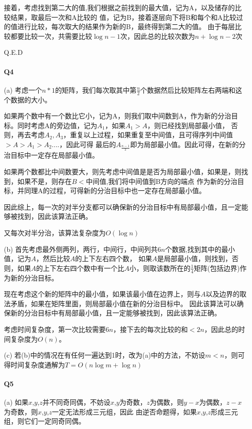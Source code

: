 \documentclass[UTF8]{ctexart}
\renewcommand{\(}{\left(}
\renewcommand{\)}{\right)}
\begin{document}
接着，考虑找到第二大的值,我们根据之前找到的最大值，记为A，以及储存的比较结果，取最后一次和A比较的
值，记为B，接着逐层向下将B和每个和A比较过的值进行比较，每次取大的结果作为新的B，最终得到第二大的值。
由于每层比较都要比较一次，共需要比较$\log{n}-1$次，因此总的比较次数为$n+\log{n}-2$次

Q.E.D

\paragraph{Q4}
(a) 考虑一个$n*1$的矩阵，我们每次取其中第$\frac{n}{2}$个数据然后比较矩阵左右两端和这个数据的大小。

如果两个数中有一个数比它小，记为A，则我们取中间数到A，作为新的分治目标。同时考虑A的旁边值，记为$A_1$，如果$A_1>A$，则已经找到局部最小值，
否则，再去考虑$A_2,A_3$，重复以上过程，如果重复至中间值，且可得序列中间值$>A>A_1>A_2....$，因此可得
最后的$A_\frac{n-1}{2}$即为局部最小值。因此可得，在新的分治目标中一定存在局部最小值。

如果两个数都比中间数要大，则先考虑中间值是是否为局部最小值，如果是，则找到，如果不是，则存在$B<$中间值,我们将中间值到B方向的端点
作为新的分治目标，并同理A的过程，可得新的分治目标中也一定存在局部最小值。

因此综上，每一次的对半分支都可以确保新的分治目标中有局部最小值，且一定能够被找到，因此该算法正确。

又每次对半分治，该算法复杂度为$O(\log{n})$

(b) 首先考虑最外侧两列，两行，中间行，中间列共$6n$个数据,找到其中的最小值，记为$A$，然后比较$A$的上下左右四个数，
如果$A$是局部最小值，则找到，否则，如果$A$的上下左右四个数中有一个比$A$小，则取该数所在的$\frac{1}{4}$矩阵(包括边界)作为新的分治目标。

现在考虑这个新的矩阵中的最小值，如果该最小值在边界上，则与$A$以及边界的取法矛盾，如果在矩阵里面，则局部最小值在新的分治目标中。
因此该算法可以确保新的分治目标中有局部最小值，且一定能够被找到，因此该算法正确。

考虑时间复杂度，第一次比较需要$6n$，接下去的每次比较的和$<2n$，因此总的时间复杂度为$O(n)$。

(c) 若(b)中的情况在有任何一遍达到1时，改为(a)中的方法，不妨设$m<n$，则可得时间复杂度通解为$T=O(n\log{m}+\log{n})$

\paragraph{Q5}

(a) 如果$x$,$y$,$z$并不同奇同偶，不妨设$x$,$y$为奇数，$z$为偶数，则$y-x$为偶数，$z-x$为奇数，则$x$,$y$,$z$一定无法形成三元组，因此
由逆否命题得，如果$x$,$y$,$z$形成三元组，则它们一定同奇同偶。
\end{document}
